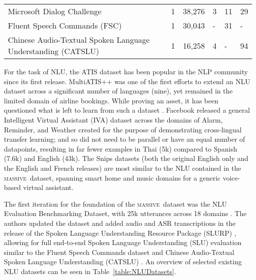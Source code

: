 \documentclass[11pt]{article}
\newcommand{\M}{\textsc{massive}}
\begin{document}
\begin{table*}[!ht]
{\begin{tabular}{llllll}
Microsoft Dialog Challenge \citep{li2018microsoft}                  & 1            & 38,276 & 3 & 11 & 29 \\
Fluent Speech Commands (FSC) \citep{lugosch2019speech}        & 1            & 30,043 & - & 31 & -                 \\
Chinese Audio-Textual Spoken Language Understanding (CATSLU) \citep{10.1145/3340555.3356098}         & 1            & 16,258 & 4 & - &  94                 \\
\bottomrule
\end{tabular}}
\caption{\label{table:NLUDatasets} Selected NLU benchmark datasets with number of languages, utterances per language, domain count, intent count, and slot count.}
\end{table*}

For the task of NLU, the ATIS dataset has been popular in the NLP community since its first release.
MultiATIS++ was one of the first efforts to extend an NLU dataset across a significant number of languages (nine), yet remained in the limited domain of airline bookings.
While proving an asset, it has been questioned what is left to learn from such a dataset \citep{tur2010left}.
Facebook released a general Intelligent Virtual Assistant (IVA) dataset across the domains of Alarm, Reminder, and Weather \citep{schuster-etal-2019-cross-lingual} created for the purpose of demonstrating cross-lingual transfer learning; and so did not need to be parallel or have an equal number of datapoints, resulting in far fewer examples in Thai (5k) compared to Spanish (7.6k) and English (43k).
The Snips datasets (both the original English only and the English and French releases) are most similar to the NLU contained in the \M~dataset, spanning smart home and music domains for a generic voice-based virtual assistant.

The first iteration for the foundation of the \M~dataset was the NLU Evaluation Benchmarking Dataset, with 25k utterances across 18 domains \citep{liu2019benchmarking}.
The authors updated the dataset and added audio and ASR transcriptions in the release of the Spoken Language Understanding Resource Package (SLURP) \citep{bastianelli-etal-2020-slurp}, allowing for full end-to-end Spoken Language Understanding (SLU) evaluation similar to the Fluent Speech Commands dataset \citep{lugosch2019speech} and Chinese Audio-Textual Spoken Language Understanding (CATSLU) \citep{10.1145/3340555.3356098}.
An overview of selected existing NLU datasets can be seen in Table~\ref{table:NLUDatasets}.
\end{document}
